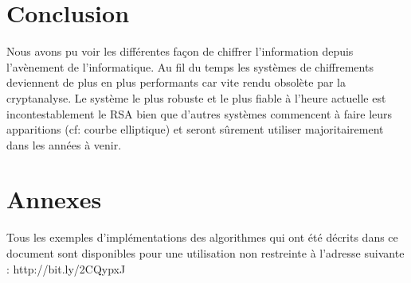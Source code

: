 \chapter*{Conclusion}
Nous avons pu voir les différentes façon de chiffrer l'information depuis l'avènement de l'informatique. Au fil du temps les systèmes de chiffrements deviennent de plus en plus performants car vite rendu obsolète par la cryptanalyse. Le système le plus robuste et le plus fiable à l'heure actuelle est incontestablement le RSA bien que d'autres systèmes commencent à faire leurs apparitions (cf: courbe elliptique) et seront sûrement utiliser majoritairement dans les années à venir.
\chapter{Annexes}
Tous les exemples d'implémentations des algorithmes qui ont été décrits dans ce document sont disponibles pour une utilisation non restreinte à l'adresse suivante : http://bit.ly/2CQypxJ
